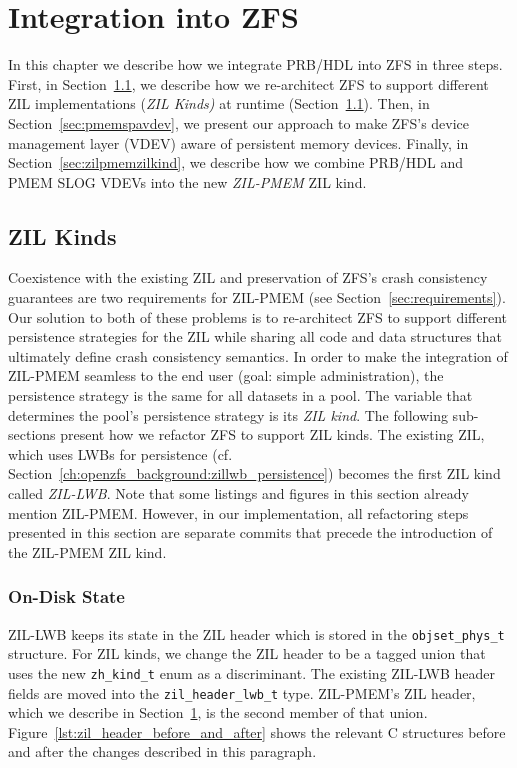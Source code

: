 \documentclass[12pt,a4paper,twoside]{book}
\begin{document}


\chapter{Integration into ZFS}\label{ch:zilpmem}
In this chapter we describe how we integrate PRB/HDL into ZFS in three steps.
First, in Section~\ref{ch:zilkinds}, we describe how we re-architect ZFS to support different ZIL implementations (\textit{ZIL Kinds)} at runtime (Section~\ref{ch:zilkinds}).
Then, in Section~\ref{sec:pmemspavdev}, we present our approach to make ZFS's device management layer (VDEV) aware of persistent memory devices.
Finally, in Section~\ref{sec:zilpmemzilkind}, we describe how we combine PRB/HDL and PMEM SLOG VDEVs into the new \textit{ZIL-PMEM} ZIL kind.

\section{ZIL Kinds}\label{ch:zilkinds}
Coexistence with the existing ZIL and preservation of ZFS's crash consistency guarantees are two requirements for ZIL-PMEM (see Section~\ref{sec:requirements}).
Our solution to both of these problems is to re-architect ZFS to support different persistence strategies for the ZIL while sharing all code and data structures that ultimately define crash consistency semantics.
In order to make the integration of ZIL-PMEM seamless to the end user (goal: simple administration), the persistence strategy is the same for all datasets in a pool.
The variable that determines the pool's persistence strategy is its \textit{ZIL kind}.
The following sub-sections present how we refactor ZFS to support ZIL kinds.
The existing ZIL, which uses LWBs for persistence (cf. Section~\ref{ch:openzfs_background:zillwb_persistence}) becomes the first ZIL kind called \textit{ZIL-LWB}.
Note that some listings and figures in this section already mention ZIL-PMEM.
However, in our implementation, all refactoring steps presented in this section are separate commits that precede the introduction of the ZIL-PMEM ZIL kind.

\subsection{On-Disk State}\label{sec:di:zil_header}
ZIL-LWB keeps its state in the ZIL header which is stored in the \lstinline{objset_phys_t} structure.
For ZIL kinds, we change the ZIL header to be a tagged union that uses the new \lstinline{zh_kind_t} enum as a discriminant.
The existing ZIL-LWB header fields are moved into the \lstinline{zil_header_lwb_t} type.
ZIL-PMEM's ZIL header, which we describe in Section~\ref{ch:zilpmem}, is the second member of that union.
Figure~\ref{lst:zil_header_before_and_after} shows the relevant C structures before and after the changes described in this paragraph.
\end{document}
